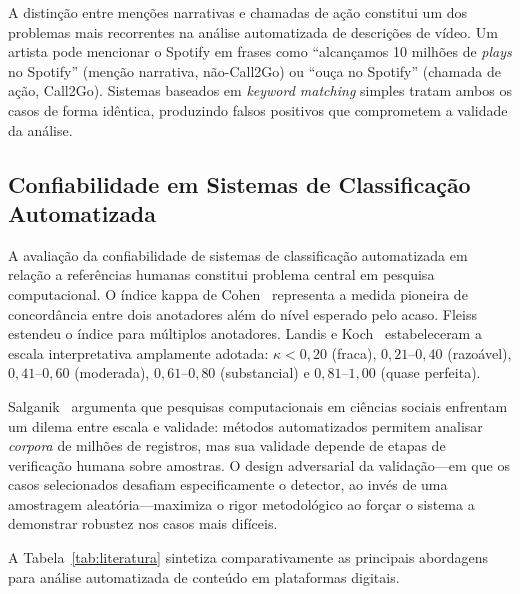 ﻿\documentclass[12pt]{article}
\begin{document}
A distinção entre menções narrativas e chamadas de ação constitui um dos
problemas mais recorrentes na análise automatizada de descrições de vídeo.
Um artista pode mencionar o Spotify em frases como ``alcançamos 10 milhões de
\textit{plays} no Spotify'' (menção narrativa, não-Call2Go) ou ``ouça no
Spotify'' (chamada de ação, Call2Go). Sistemas baseados em
\textit{keyword matching} simples tratam ambos os casos de forma idêntica,
produzindo falsos positivos que comprometem a validade da análise.

\subsection{Confiabilidade em Sistemas de Classificação Automatizada}

A avaliação da confiabilidade de sistemas de classificação automatizada em
relação a referências humanas constitui problema central em pesquisa
computacional. O índice kappa de Cohen~\cite{cohen1960} representa a medida
pioneira de concordância entre dois anotadores além do nível esperado pelo
acaso. Fleiss~\cite{fleiss1971} estendeu o índice para múltiplos anotadores.
Landis e Koch~\cite{landis1977} estabeleceram a escala interpretativa
amplamente adotada: $\kappa < 0{,}20$ (fraca), $0{,}21$--$0{,}40$ (razoável),
$0{,}41$--$0{,}60$ (moderada), $0{,}61$--$0{,}80$ (substancial) e
$0{,}81$--$1{,}00$ (quase perfeita).

Salganik~\cite{salganik2019} argumenta que pesquisas computacionais em
ciências sociais enfrentam um dilema entre escala e validade: métodos
automatizados permitem analisar \textit{corpora} de milhões de registros, mas
sua validade depende de etapas de verificação humana sobre amostras. O design
adversarial da validação---em que os casos selecionados desafiam
especificamente o detector, ao invés de uma amostragem aleatória---maximiza
o rigor metodológico ao forçar o sistema a demonstrar robustez nos casos mais
difíceis.

A Tabela~\ref{tab:literatura} sintetiza comparativamente as principais
abordagens para análise automatizada de conteúdo em plataformas digitais.
\end{document}
